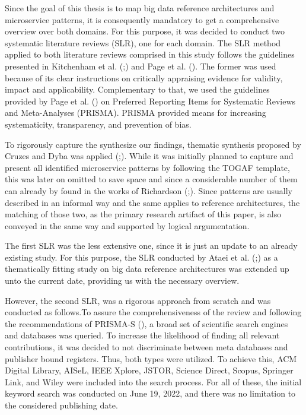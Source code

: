 \documentclass[conference]{IEEEtran}
\begin{document}
Since the goal of this thesis is to map big data reference architectures and microservice patterns, it is consequently mandatory to get a comprehensive overview over both domains. For this purpose, it was decided to conduct two systematic literature reviews (SLR), one for each domain.
The SLR method applied to both literature reviews comprised in this study follows the guidelines presented in Kitchenham et al. (\cite{Kitchenham.2004};) and Page et al. (\cite{Page.2021}). The former was used because of its clear instructions on critically appraising evidence for validity, impact and applicability. Complementary to that, we used the guidelines provided by Page et al. (\cite{Page.2021}) on Preferred Reporting Items for Systematic Reviews and Meta-Analyses (PRISMA). PRISMA provided means for increasing systematicity, transparency, and prevention of bias.

To rigorously capture the synthesize our findings, thematic synthesis proposed by Cruzes and Dyba was applied (\cite{Cruzes.2011};). While it was initially planned to capture and present all identified microservice patterns by following the TOGAF template, this was later on omitted to save space and since a considerable number of them can already by found in the works of Richardson (\cite{Richardson.2022};). Since patterns are usually described in an informal way and the same applies to reference architectures, the matching of those two, as the primary research artifact of this paper, is also conveyed in the same way and supported by logical argumentation.

The first SLR was the less extensive one, since it is just an update to an already existing study. For this purpose, the SLR conducted by Ataei et al. (\cite{Ataei.2020};) as a thematically fitting study on big data reference architectures was extended up unto the current date, providing us with the necessary overview. 

However, the second SLR, was a rigorous approach from scratch and was conducted as follows.To assure the comprehensiveness of the review and following the recommendations of PRISMA-S (\cite{rethlefsen2021prisma}), a broad set of scientific search engines and databases was queried. To increase the likelihood of finding all relevant contributions, it was decided to not discriminate between meta databases and publisher bound registers. Thus, both types were utilized. To achieve this, ACM Digital Library, AISeL, IEEE Xplore, JSTOR, Science Direct, Scopus, Springer Link, and Wiley were included into the search process. For all of these, the initial keyword search was conducted on June 19, 2022, and there was no limitation to the considered publishing date.
\end{document}
